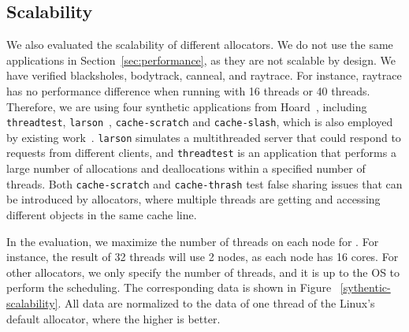 \subsection{Scalability}
\label{sec:scale}

We also evaluated the scalability of different allocators. We do not use the same applications in Section~\ref{sec:performance}, as they are not scalable by design. We have verified blacksholes, bodytrack, canneal, and raytrace. For instance, raytrace has no performance difference when running with 16 threads or 40 threads. Therefore, we are using four synthetic applications from Hoard~\cite{Hoard}, including \texttt{threadtest}, \texttt{larson}~\cite{Larson}, \texttt{cache-scratch} and \texttt{cache-slash}, which is also employed by existing work~\cite{Scalloc}. \texttt{larson} simulates a multithreaded server that could respond to requests from different clients, and \texttt{threadtest} is an application that performs a large number of allocations and deallocations within a specified number of threads. Both \texttt{cache-scratch} and \texttt{cache-thrash} test false sharing issues that can be introduced by allocators, where multiple threads are getting and accessing different objects in the same cache line.  

In the evaluation, we maximize the number of threads on each node for \NM{}. For instance, the result of 32 threads will use 2 nodes, as each node has 16 cores. For other allocators, we only specify the number of threads, and it is up to the OS to perform the scheduling. The corresponding data is shown in Figure ~\ref{sythentic-scalability}. All data are normalized to the data of one thread of the Linux's default allocator, where the higher is better.  

